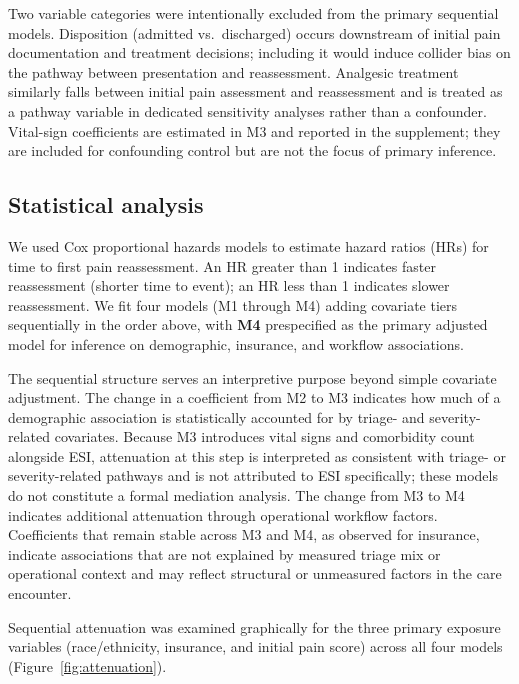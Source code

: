 \documentclass[11pt]{article}
\begin{document}
Two variable categories were intentionally excluded from the primary sequential models.
Disposition (admitted vs.\ discharged) occurs downstream of initial pain documentation and treatment decisions; including it would induce collider bias on the pathway between presentation and reassessment.
Analgesic treatment similarly falls between initial pain assessment and reassessment and is treated as a pathway variable in dedicated sensitivity analyses rather than a confounder.
Vital-sign coefficients are estimated in M3 and reported in the supplement; they are included for confounding control but are not the focus of primary inference.

\subsection{Statistical analysis}

We used Cox proportional hazards models to estimate hazard ratios (HRs) for time to first pain reassessment.
An HR greater than 1 indicates faster reassessment (shorter time to event); an HR less than 1 indicates slower reassessment.
We fit four models (M1 through M4) adding covariate tiers sequentially in the order above, with \textbf{M4} prespecified as the primary adjusted model for inference on demographic, insurance, and workflow associations.

The sequential structure serves an interpretive purpose beyond simple covariate adjustment.
The change in a coefficient from M2 to M3 indicates how much of a demographic association is statistically accounted for by triage- and severity-related covariates.
Because M3 introduces vital signs and comorbidity count alongside ESI, attenuation at this step is interpreted as consistent with triage- or severity-related pathways and is not attributed to ESI specifically; these models do not constitute a formal mediation analysis.
The change from M3 to M4 indicates additional attenuation through operational workflow factors.
Coefficients that remain stable across M3 and M4, as observed for insurance, indicate associations that are not explained by measured triage mix or operational context and may reflect structural or unmeasured factors in the care encounter.

Sequential attenuation was examined graphically for the three primary exposure variables (race/ethnicity, insurance, and initial pain score) across all four models (Figure~\ref{fig:attenuation}).
\end{document}
